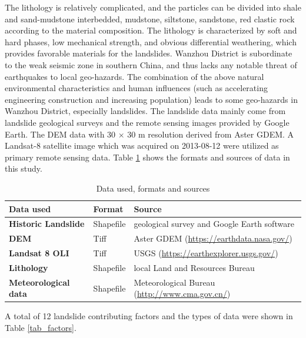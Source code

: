 \documentclass[a4paper,fleqn]{cas-sc}
\begin{document}
The lithology is relatively complicated, and the particles can be divided into shale and sand-mudstone interbedded, mudstone, siltstone, sandstone, red clastic rock according to the material composition. 
The lithology is characterized by soft and hard phases, low mechanical strength, and obvious differential weathering, which provides favorable materials for the landslides. 
Wanzhou District is subordinate to the weak seismic zone in southern China, and thus lacks any notable threat of earthquakes to local geo-hazards. 
The combination of the above natural environmental characteristics and human influences (such as accelerating engineering construction and increasing population) leads to some geo-hazards in Wanzhou District, especially landslides. 
The landslide data mainly come from landslide geological surveys and the remote sensing images provided by Google Earth. 
The DEM data with 30 $\times$ 30 m resolution derived from Aster GDEM. 
A Landsat-8 satellite image which was acquired on 2013-08-12 were utilized as primary remote sensing data. 
Table \ref{tab_datasource} shows the formats and sources of data in this study. 

\begin{table}
  \caption{Data used, formats and sources}
  \begin{tabular}{lll}
    \toprule
    {\textbf{Data used}} & \textbf{Format} & \textbf{Source}\\
    \midrule
    \textbf{Historic Landslide} & Shapefile & geological survey and Google Earth software\\
    \textbf{DEM} & Tiff & Aster GDEM (\url{https://earthdata.nasa.gov/})\\
    \textbf{Landsat 8 OLI} & Tiff & USGS (\url{https://earthexplorer.usgs.gov/})\\
    \textbf{Lithology} & Shapefile & local Land and Resources Bureau\\
    \textbf{Meteorological data} & Shapefile & Meteorological Bureau (\url{http://www.cma.gov.cn/})\\
    \bottomrule
  \end{tabular}
  \label{tab_datasource}
\end{table}

A total of 12 landslide contributing factors and the types of data were shown in Table \ref{tab_factors}. 
\end{document}
